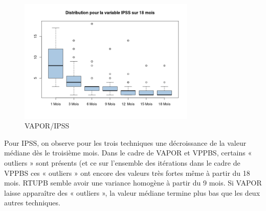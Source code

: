\begin{figure}[H]
\centering
\includegraphics[width=0.75\textwidth]{../Fig/VAPOR/vapor-boxplot-post-ipss}
\caption{VAPOR/IPSS}
\end{figure}

%

Pour IPSS, on observe pour les trois techniques une décroissance de la valeur médiane dès le troisième mois. Dans le cadre de VAPOR et VPPBS, certains « outliers » sont présents (et ce sur l’ensemble des itérations dans le cadre de VPPBS ces « outliers » ont encore des valeurs très fortes même à partir du 18 mois.  RTUPB  semble avoir une variance homogène à partir du 9 mois. Si VAPOR laisse apparaître des « outliers », la valeur médiane termine plus bas que les deux autres techniques. 
